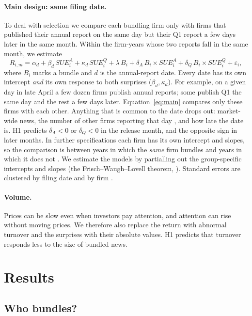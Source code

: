 \documentclass[11pt]{article}
\newcommand{\SUEA}{SUE^{A}}
\newcommand{\SUEQ}{SUE^{Q}}
\begin{document}
\paragraph{Main design: same filing date.} To deal with selection we compare each bundling firm only with firms that
published their annual report on the same day but their Q1 report a few days later in the same month. Within the
firm-years whose two reports fall in the same month, we estimate
\begin{equation}
R_{i,m} = \alpha_d + \beta_d\,\SUEA_i + \kappa_d\,\SUEQ_i + \lambda\, B_i + \delta_A\, B_i\times\SUEA_i
+ \delta_Q\, B_i\times\SUEQ_i + \varepsilon_i ,
\label{eq:main}
\end{equation}
where $B_i$ marks a bundle and $d$ is the annual-report date. Every date has its own intercept \emph{and} its own
response to both surprises ($\beta_d,\kappa_d$). For example, on a given day in late April a few dozen firms publish
annual reports; some publish Q1 the same day and the rest a few days later. Equation~\eqref{eq:main} compares only
these firms with each other. Anything that is common to the date drops out: market-wide news, the number of other
firms reporting that day \citep{hirshleifer2009,you2011}, and how late the date is. H1 predicts $\delta_A<0$ or
$\delta_Q<0$ in the release month, and the opposite sign in later months. In further specifications each firm has
its own intercept and slopes, so the comparison is between years in which the \emph{same} firm bundles and years in
which it does not \citep[ch.~8]{cunningham2021}. We estimate the models by partialling out the group-specific
intercepts and slopes (the Frisch--Waugh--Lovell theorem, \citealp{lovell1963}). Standard errors are clustered by
filing date and by firm \citep{petersen2009,cameron2011}.

\paragraph{Volume.} Prices can be slow even when investors pay attention, and attention can rise without moving
prices. We therefore also replace the return with abnormal turnover and the surprises with their absolute values. H1
predicts that turnover responds less to the size of bundled news.

\section{Results}

\subsection{Who bundles?}
\end{document}
